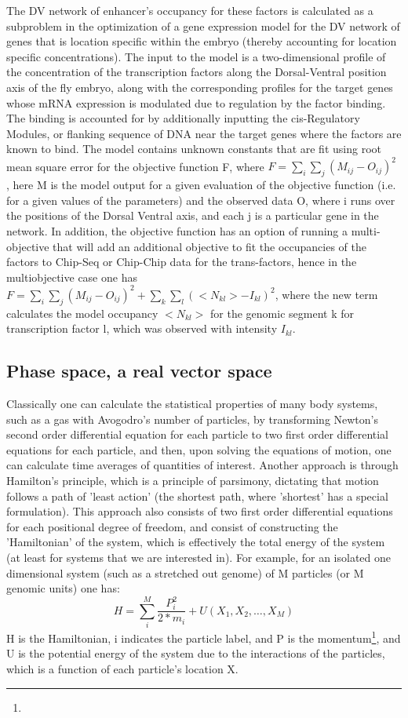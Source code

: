 The DV network of enhancer's occupancy for these factors is calculated as a subproblem in the optimization of a gene expression model for the DV network of genes that is location specific within the embryo (thereby accounting for location specific concentrations).  The input to the model is a two-dimensional profile of the concentration of the transcription factors along the Dorsal-Ventral position axis of the fly embryo, along with the corresponding profiles for the target genes whose mRNA expression is modulated due to regulation by the factor binding.  The binding is accounted for by additionally inputting the cis-Regulatory Modules, or flanking sequence of DNA near the target genes where the factors are known to bind.  The model contains unknown constants that are fit using root mean square error for the objective function F, where  $F=\sum_i \sum_j (M_{ij}-O_{ij})^2$ , here M is the model output for a given evaluation of the objective function (i.e. for a given values of the parameters) and the observed data O, where i runs over the positions of the Dorsal Ventral axis, and each j is a particular gene in the network.   In addition, the objective function has an option of running a multi-objective that will add an additional objective to fit the occupancies of the factors to Chip-Seq or Chip-Chip data for the trans-factors, hence in the multiobjective case one has $F=\sum_i \sum_j(M_{ij}-O_{ij})^2 + \sum_k \sum_l (<N_{kl}>-I_{kl} )^2$, where the new term calculates the model occupancy $<N_{kl}>$ for the genomic segment k for transcription factor l, which was observed with intensity $I_{kl}$.  

\subsection{Phase space, a real vector space }
Classically one can calculate the statistical properties of many body systems, such as a gas with Avogodro's number of particles, by transforming Newton's second order differential equation for each particle to two first order differential equations for each particle, and then, upon solving the equations of motion, one can calculate time averages of quantities of interest.  Another approach is through Hamilton's principle, which is a principle of parsimony, dictating that motion follows a path of 'least action' (the shortest path, where 'shortest' has a special formulation).  This approach also consists of two first order differential equations for each positional degree of freedom, and consist of constructing the 'Hamiltonian' of the system, which is effectively the total energy of the system (at least for systems that we are interested in).  For example, for an isolated one dimensional system (such as a stretched out genome) of M particles (or M genomic units) one has:
  \begin{equation}\label{hamiltonian}
    H= \sum_i^M \frac{P_i^2}{2*m_i} + U(X_1, X_2,\dotsc ,X_M)
  \end{equation}
  H is the Hamiltonian, i indicates the particle label, and P is the momentum\footnote{}, and U is the potential energy of the system due to the interactions of the particles, which is a function of each particle's location X.  
  
